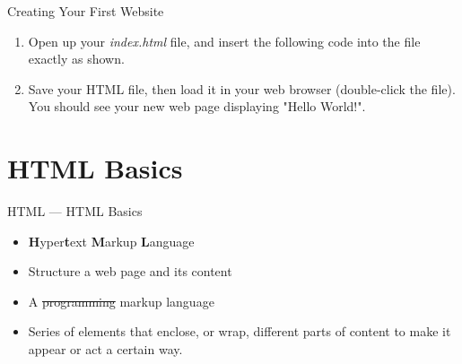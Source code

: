 \documentclass[aspectratio=169]{beamer}
\begin{document}
\begin{darkframes}
    
    \begin{frame}{Creating Your First Website}
        \begin{enumerate}
            \item Open up your \textit{index.html} file, and insert the following code into the file exactly as shown.
            \firstWebPage
            \item Save your HTML file, then load it in your web browser (double-click the file). You should see your new web page displaying "Hello World!". 
        \end{enumerate}
    \end{frame}
    
    \section{HTML Basics}
    \begin{frame}{HTML — HTML Basics}
    \begin{itemize}
        \item \textbf{H}yper\textbf{t}ext \textbf{M}arkup \textbf{L}anguage
        \item Structure a web page and its content
        \item A \st{programming} markup language
        \item Series of elements that enclose, or wrap, different parts of content to make it appear or act a certain way.
    \end{itemize}
    \end{frame}
    

\end{darkframes}
\end{document}
